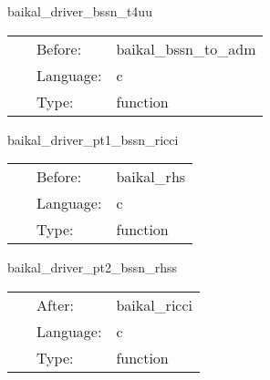\vspace{5mm}


\hspace{5mm} baikal\_driver\_bssn\_t4uu 

\hspace{5mm}{\it mol: compute t4uu, needed for bssn rhss. } 


\hspace{5mm}

 \begin{tabular*}{160mm}{cll} 
~ & Before:  & baikal\_bssn\_to\_adm \\ 
~ & Language:  & c \\ 
~ & Type:  & function \\ 
\end{tabular*} 


\vspace{5mm}


\hspace{5mm} baikal\_driver\_pt1\_bssn\_ricci 

\hspace{5mm}{\it mol: compute ricci tensor } 


\hspace{5mm}

 \begin{tabular*}{160mm}{cll} 
~ & Before:  & baikal\_rhs \\ 
~ & Language:  & c \\ 
~ & Type:  & function \\ 
\end{tabular*} 


\vspace{5mm}


\hspace{5mm} baikal\_driver\_pt2\_bssn\_rhss 

\hspace{5mm}{\it mol: evaluate bssn rhss } 


\hspace{5mm}

 \begin{tabular*}{160mm}{cll} 
~ & After:  & baikal\_ricci \\ 
~ & Language:  & c \\ 
~ & Type:  & function \\ 
\end{tabular*} 


